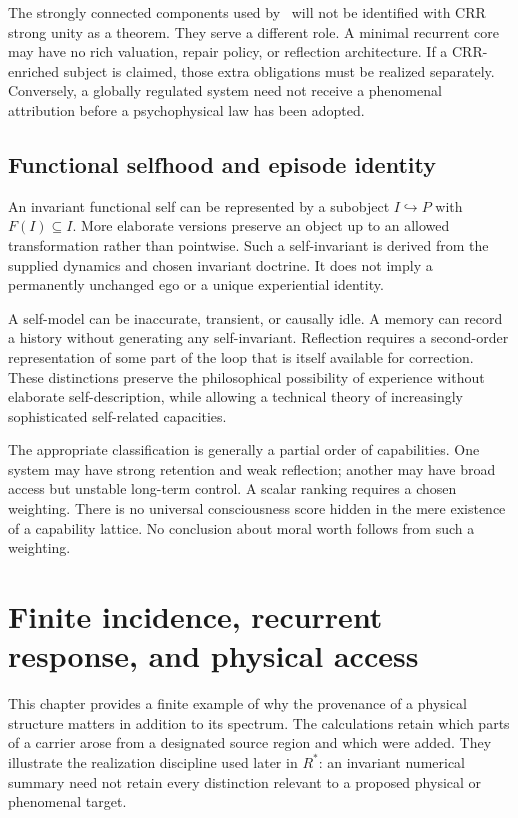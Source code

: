 The strongly connected components used by \spctwo\ will not be identified with CRR strong unity as a theorem. They serve a different role. A minimal recurrent core may have no rich valuation, repair policy, or reflection architecture. If a CRR-enriched subject is claimed, those extra obligations must be realized separately. Conversely, a globally regulated system need not receive a phenomenal attribution before a psychophysical law has been adopted.

\section{Functional selfhood and episode identity}\label{section:crr:functional-selfhood-and-episode-identity}
An invariant functional self can be represented by a subobject $I\hookrightarrow P$ with $F(I)\subseteq I$. More elaborate versions preserve an object up to an allowed transformation rather than pointwise. Such a self-invariant is derived from the supplied dynamics and chosen invariant doctrine. It does not imply a permanently unchanged ego or a unique experiential identity.

A self-model can be inaccurate, transient, or causally idle. A memory can record a history without generating any self-invariant. Reflection requires a second-order representation of some part of the loop that is itself available for correction. These distinctions preserve the philosophical possibility of experience without elaborate self-description, while allowing a technical theory of increasingly sophisticated self-related capacities.

The appropriate classification is generally a partial order of capabilities. One system may have strong retention and weak reflection; another may have broad access but unstable long-term control. A scalar ranking requires a chosen weighting. There is no universal consciousness score hidden in the mere existence of a capability lattice. No conclusion about moral worth follows from such a weighting.

\chapter{Finite incidence, recurrent response, and physical access}\label{ch:o1}
This chapter provides a finite example of why the provenance of a physical structure matters in addition to its spectrum. The calculations retain which parts of a carrier arose from a designated source region and which were added. They illustrate the realization discipline used later in $R^\ast$: an invariant numerical summary need not retain every distinction relevant to a proposed physical or phenomenal target.

